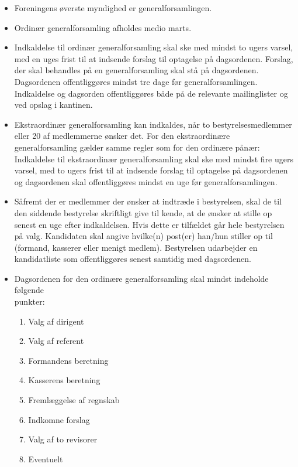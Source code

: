 \documentclass[a4paper, 10pt]{article}
\begin{document}
\begin{itemize}

\item Foreningens øverste myndighed er generalforsamlingen.

\item Ordinær generalforsamling afholdes medio marts.

\item Indkaldelse til ordinær generalforsamling skal ske med mindst to
ugers varsel, med en uges frist til at indsende forslag til optagelse
på dagsordenen. Forslag, der skal behandles på en generalforsamling
skal stå på dagsordenen. Dagsordenen offentliggøres mindst tre dage
før generalforsamlingen. Indkaldelse og dagsorden offentliggøres både
på de relevante mailinglister og ved opslag i kantinen.

\item Ekstraordinær generalforsamling kan indkaldes, når to
bestyrelsesmedlemmer eller 20 af medlemmerne ønsker det. For den
ekstraordinære generalforsamling gælder samme regler som for den
ordinære pånær: Indkaldelse til ekstraordinær generalforsamling skal
ske med mindst fire ugers varsel, med to ugers frist til at indsende
forslag til optagelse på dagsordenen og dagsordenen skal
offentliggøres mindst en uge før generalforsamlingen.

\item Såfremt der er medlemmer der ønsker at indtræde i bestyrelsen,
skal de til den siddende bestyrelse skriftligt give til kende, at de
ønsker at stille op senest en uge efter indkaldelsen.  Hvis dette er
tilfældet går hele bestyrelsen på valg. Kandidaten skal angive
hvilke(n) post(er) han/hun stiller op til (formand, kasserer eller
menigt medlem). Bestyrelsen udarbejder en kandidatliste som
offentliggøres senest samtidig med dagsordenen.

\item Dagsordenen for den ordinære generalforsamling skal mindst
indeholde følgende \\ punkter:

\begin{enumerate}

\item Valg af dirigent

\item Valg af referent

\item Formandens beretning

\item Kasserens beretning

\item Fremlæggelse af regnskab

\item Indkomne forslag

\item Valg af to revisorer

\item Eventuelt

\end{enumerate}

\end{itemize}
\end{document}
